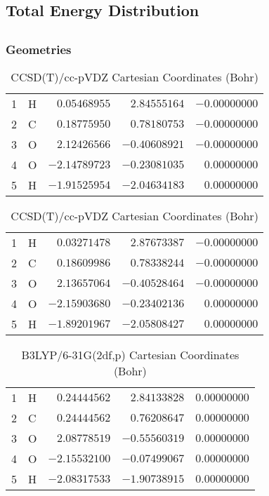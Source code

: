 \documentclass[10pt,oneside]{article}
\begin{document}
\begin{table}
\subsection*{Total Energy Distribution}
\centering\end{table}

\clearpage

\subsection{}

\begin{table}[h!]
\subsubsection*{Geometries}
\begin{multicols}{2}
\centering
\caption{CCSD(T)/cc-pVTZ Cartesian Coordinates (Bohr)}
\begin{tabular}{llrrr}
\toprule
1  & H  & $ 0.05468955$ & $ 2.84555164$ & $-0.00000000$ \\
2  & C  & $ 0.18775950$ & $ 0.78180753$ & $-0.00000000$ \\
3  & O  & $ 2.12426566$ & $-0.40608921$ & $-0.00000000$ \\
4  & O  & $-2.14789723$ & $-0.23081035$ & $ 0.00000000$ \\
5  & H  & $-1.91525954$ & $-2.04634183$ & $ 0.00000000$ \\
\bottomrule
\end{tabular}
\caption{CCSD(T)/cc-pVDZ Cartesian Coordinates (Bohr)}
\begin{tabular}{llrrr}
\toprule
1  & H  & $ 0.03271478$ & $ 2.87673387$ & $-0.00000000$ \\
2  & C  & $ 0.18609986$ & $ 0.78338244$ & $-0.00000000$ \\
3  & O  & $ 2.13657064$ & $-0.40528464$ & $-0.00000000$ \\
4  & O  & $-2.15903680$ & $-0.23402136$ & $ 0.00000000$ \\
5  & H  & $-1.89201967$ & $-2.05808427$ & $ 0.00000000$ \\
\bottomrule
\end{tabular}
\end{multicols}
\end{table}

\begin{table}[h]
\centering
\caption{B3LYP/6-31G(2df,p) Cartesian Coordinates (Bohr)}
\begin{tabular}{llrrr}
\toprule
1  & H  & $ 0.24444562$ & $ 2.84133828$ & $ 0.00000000$ \\
2  & C  & $ 0.24444562$ & $ 0.76208647$ & $ 0.00000000$ \\
3  & O  & $ 2.08778519$ & $-0.55560319$ & $ 0.00000000$ \\
4  & O  & $-2.15532100$ & $-0.07499067$ & $ 0.00000000$ \\
5  & H  & $-2.08317533$ & $-1.90738915$ & $ 0.00000000$ \\
\bottomrule
\end{tabular}
\end{table}
\end{document}
